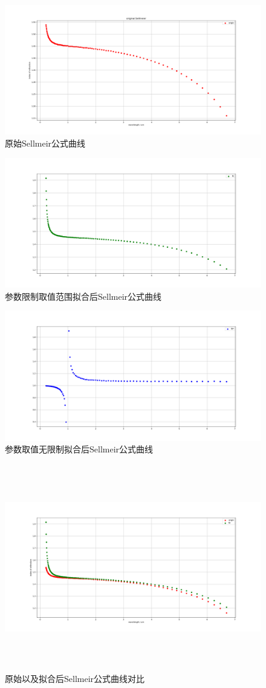 \documentclass[12pt, a4paper, oneside, UTF8]{ctexart}
\begin{document}
\begin{figure}[htbp]
    \centering
    \includegraphics[width=.81\textwidth]{origin.png}
    \caption{原始Sellmeir公式曲线}
\end{figure}
\begin{figure}[htbp]
    \centering
    \includegraphics[width=.81\textwidth]{fit.png}
    \caption{参数限制取值范围拟合后Sellmeir公式曲线}
\end{figure}
\begin{figure}[htbp]
    \centering
    \includegraphics[width=.81\textwidth]{fitnew.png}
    \caption{参数取值无限制拟合后Sellmeir公式曲线}
\end{figure}

\newpage
\begin{figure}[htbp]
    \centering
    \includegraphics[width=15cm,height=9cm]{OandF.png}
    \caption{原始以及拟合后Sellmeir公式曲线对比}
\end{figure}
\end{document}
